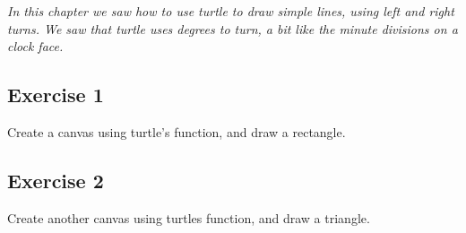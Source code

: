 \emph{In this chapter we saw how to use turtle to draw simple lines, using left and right turns.  We saw that turtle uses degrees to turn, a bit like the minute divisions on a clock face.}

\subsection*{Exercise 1}
Create a canvas using turtle's  function, and draw a rectangle.

\subsection*{Exercise 2}
Create another canvas using turtles  function, and draw a triangle.

\newpage